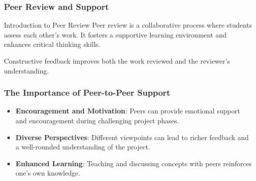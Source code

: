 \documentclass[aspectratio=169]{beamer}
\begin{document}
\begin{frame}[fragile]
    \frametitle{Peer Review and Support}
    \begin{block}{Introduction to Peer Review}
        Peer review is a collaborative process where students assess each other’s work. It fosters a supportive learning environment and enhances critical thinking skills.
    \end{block}
    Constructive feedback improves both the work reviewed and the reviewer's understanding.
\end{frame}

\begin{frame}[fragile]
    \frametitle{The Importance of Peer-to-Peer Support}
    \begin{itemize}
        \item \textbf{Encouragement and Motivation}: Peers can provide emotional support and encouragement during challenging project phases.
        \item \textbf{Diverse Perspectives}: Different viewpoints can lead to richer feedback and a well-rounded understanding of the project.
        \item \textbf{Enhanced Learning}: Teaching and discussing concepts with peers reinforces one's own knowledge.
    \end{itemize}
\end{frame}
\end{document}
